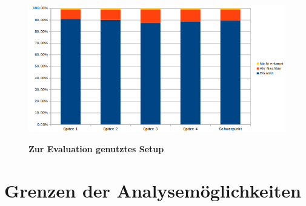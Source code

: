\begin{figure}[ht]
\centering
\includegraphics[width=\textwidth]{media/chartwithoutcovert}\\
\caption{\textbf{Zur Evaluation genutztes Setup}}
\label{Fig:testsetup}
\end{figure}


\section{Grenzen der Analysemöglichkeiten}

